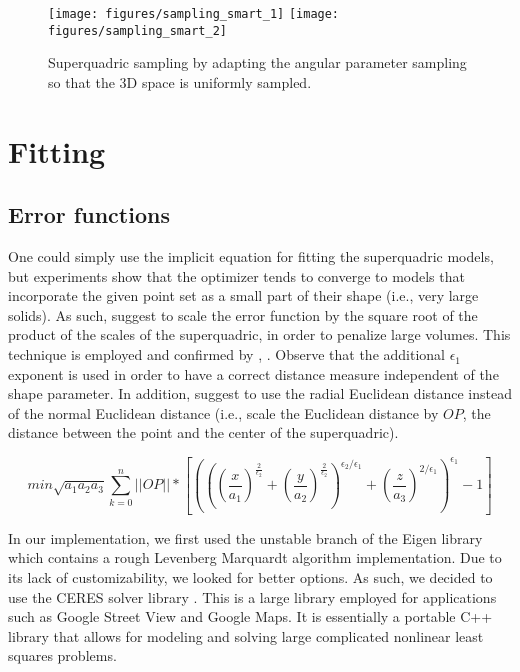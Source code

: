 \documentclass{article}
\begin{document}
\begin{figure}
\centering
\texttt{[image: figures/sampling\_smart\_1]}
\texttt{[image: figures/sampling\_smart\_2]}
\caption {Superquadric sampling by adapting the angular parameter sampling so that the 3D space is uniformly sampled.}
\label{fig:sampling_smart}
\end{figure}



\section {Fitting}
\label{sec:fitting}

\subsection*{Error functions}

One could simply use the implicit equation for fitting the superquadric models, but experiments show that the optimizer tends to converge to models that incorporate the given point set as a small part of their shape (i.e., very large solids). As such, \cite{SQ_2000} suggest to scale the error function by the square root of the product of the scales of the superquadric, in order to penalize large volumes. This technique is employed and confirmed by \cite{journals/pami/KatsoulasBK08}, \cite{conf/wscg/ChevalierJB03}. Observe that the additional $\epsilon_1$ exponent is used in order to have a correct distance measure independent of the shape parameter. In addition, \cite{conf/wscg/ChevalierJB03} suggest to use the radial Euclidean distance instead of the normal Euclidean distance (i.e., scale the Euclidean distance by $OP$, the distance between the point and the center of the superquadric).

\begin{equation}
min \sqrt {a_1 a_2 a_3} \sum_{k=0}^n ||OP|| * \left[ \left( \left( \left( \frac{x}{a_1}\right)^{\frac{2}{\epsilon_2}} + \left( \frac{y}{a_2} \right) ^{\frac{2}{\epsilon_2}} \right)^{\epsilon_2 / \epsilon_1} + \left( \frac{z}{a_3} \right) ^{2/\epsilon_1} \right) ^{\epsilon_1} - 1 \right]
\end{equation}


In our implementation, we first used the unstable branch of the Eigen library \cite{eigenweb} which contains a rough Levenberg Marquardt algorithm implementation. Due to its lack of customizability, we looked for better options. As such, we decided to use the CERES solver library \cite{ceres-solver}. This is a large library employed for applications such as Google Street View and Google Maps. It is essentially a portable C++ library that allows for modeling and solving large complicated nonlinear least squares problems.
\end{document}
